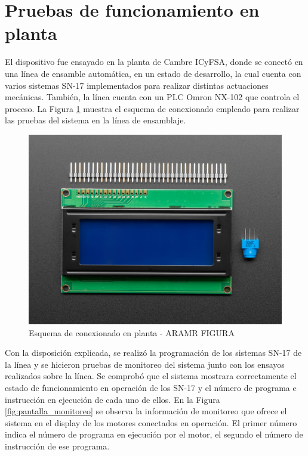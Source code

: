\section{Pruebas de funcionamiento en planta}

El dispositivo fue ensayado en la planta de Cambre ICyFSA, donde se conectó en una línea de ensamble automática, en un estado de desarrollo, la cual cuenta con varios sistemas SN-17 implementados para realizar distintas actuaciones mecánicas. También, la línea cuenta con un PLC Omron NX-102 que controla el proceso. La Figura \ref{fig:esquema_conexion_planta} muestra el esquema de conexionado empleado para realizar las pruebas del sistema en la línea de ensamblaje.

\begin{figure}[htbp]
	\centering
	\includegraphics[scale=1]{./Figures/LCD.jpg}
	\caption{Esquema de conexionado en planta - ARAMR FIGURA}
	\label{fig:esquema_conexion_planta}
\end{figure}

Con la disposición explicada, se realizó la programación de los sistemas SN-17 de la línea y se hicieron pruebas de monitoreo del sistema junto con los ensayos realizados sobre la línea. Se comprobó que el sistema mostrara correctamente el estado de funcionamiento en operación de los SN-17 y el número de programa e instrucción en ejecución de cada uno de ellos. En la Figura \ref{fig:pantalla_monitoreo} se observa la información de monitoreo que ofrece el sistema en el display de los motores conectados en operación. El primer número indica el número de programa en ejecución por el motor, el segundo el número de instrucción de ese programa.

